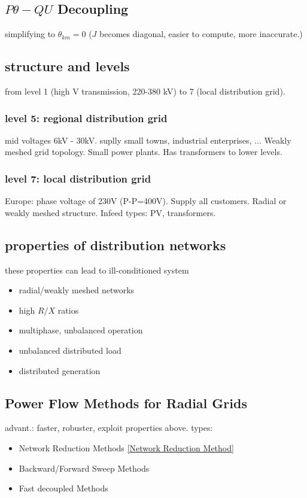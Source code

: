 \documentclass[a4paper,10pt,landscape]{scrartcl}
\begin{document}
\begin{multicols*}{3}
\subsection{$P\theta-QU$ Decoupling}
simplifying to $\theta_{km}=0$ ($J$ becomes diagonal, easier to compute, more inaccurate.)

\subsection{structure and levels}
from level 1 (high V transmission, 220-380 kV) to 7 (local distribution grid).
\subsubsection{level 5: regional distribution grid}
mid voltages 6kV - 30kV. suplly small towns, industrial enterprises, ... Weakly meshed grid topology. Small power plants. Has transformers to lower levels.
\subsubsection{level 7: local distribution grid}
Europe: phase voltage of 230V (P-P=400V). Supply all customers. Radial or weakly meshed structure. Infeed types: PV, transformers.
\subsection{properties of distribution networks}
these properties can lead to ill-conditioned system
\begin{itemize}
    \item radial/weakly meshed networks
    \item high $R/X$ ratios
    \item multiphase, unbalanced operation
    \item unbalanced distributed load
    \item distributed generation
\end{itemize}
\subsection{Power Flow Methods for Radial Grids}
advant.: faster, robuster, exploit properties above. types:
\begin{itemize}
    \item Network Reduction Methods \ref{Network Reduction Method}
    \item Backward/Forward Sweep Methods
    \item Fast decoupled Methods
\end{itemize}


\end{multicols*}
\end{document}
